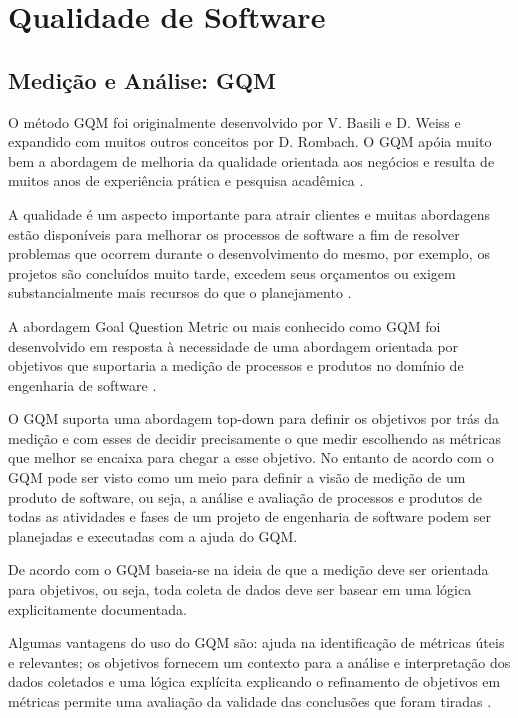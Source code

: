\section{Qualidade de Software}

\subsection{Medição e Análise: GQM}

O método GQM foi originalmente desenvolvido por V. Basili e D. Weiss e expandido com muitos outros conceitos por D.  Rombach. O GQM apóia muito bem a abordagem de melhoria da qualidade orientada aos negócios e resulta de muitos anos de experiência prática e pesquisa acadêmica \cite{solingen}.

A qualidade é um aspecto importante para atrair clientes e muitas abordagens estão disponíveis para melhorar os processos de software a fim de resolver problemas que ocorrem durante o desenvolvimento do mesmo, por exemplo, os projetos são concluídos muito tarde, excedem seus orçamentos ou exigem substancialmente mais recursos do que o planejamento \cite{solingen}.

A abordagem Goal Question Metric ou mais conhecido como GQM foi desenvolvido em resposta à necessidade de uma abordagem orientada por objetivos que suportaria a medição de processos e produtos no domínio de engenharia de software \cite{differding}.

O GQM suporta uma abordagem top-down para definir os objetivos por trás da medição e com esses de decidir precisamente o que medir escolhendo as métricas que melhor se encaixa para chegar a esse objetivo. No entanto de acordo com \cite{differding} o GQM pode ser visto como um meio para definir a visão de medição de um produto de software, ou seja, a análise e avaliação de processos e produtos de todas as atividades e fases de um projeto de engenharia de software podem ser planejadas e executadas com a ajuda do GQM.

De acordo com \cite{differding} o GQM baseia-se na ideia de que a medição deve ser orientada para objetivos, ou seja, toda coleta de dados deve ser basear em uma lógica explicitamente documentada.

Algumas vantagens do uso do GQM são: ajuda na identificação de métricas úteis e relevantes; os objetivos fornecem um
contexto para a análise e interpretação dos dados coletados e uma lógica explícita explicando o refinamento de objetivos
em métricas permite uma avaliação da validade das conclusões que foram tiradas \cite{differding}.

